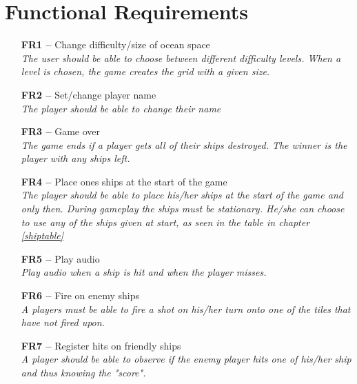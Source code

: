 \chapter{Functional Requirements}

\begin{itemize}
    \item[\textbf{FR1 --}] Change difficulty/size of ocean space \\
    \textit{\small{The user should be able to choose between different difficulty levels. When a level is chosen, the game creates the grid with a given size.}}
    \item[\textbf{FR2 --}] Set/change player name \\
    \textit{\small{The player should be able to change their name}}
    \item[\textbf{FR3 --}] Game over \\
    \textit{\small{The game ends if a player gets all of their ships destroyed. The winner is the player with any ships left.}}
    \item[\textbf{FR4 --}] Place ones ships at the start of the game \\
    \textit{\small{The player should be able to place his/her ships at the start of the game and only then. During gameplay the ships must be stationary. He/she can choose to use any of the ships given at start, as seen in the table in chapter \ref{shiptable}}}
    \item[\textbf{FR5 --}] Play audio \\
    \textit{\small{Play audio when a ship is hit and when the player misses.}}
    \item[\textbf{FR6 --}] Fire on enemy ships \\
    \textit{\small{A players must be able to fire a shot on his/her turn onto one of the tiles that have not fired upon.}}
    \item[\textbf{FR7 --}] Register hits on friendly ships \\
    \textit{\small{A player should be able to observe if the enemy player hits one of his/her ship and thus knowing the "score".}}
\end{itemize}